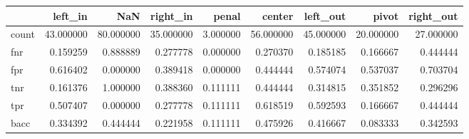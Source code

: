\begin{tabular}{lrrrrrrrr}
\toprule
{} &    left\_in &        NaN &   right\_in &     penal &     center &   left\_out &      pivot &  right\_out \\
\midrule
count &  43.000000 &  80.000000 &  35.000000 &  3.000000 &  56.000000 &  45.000000 &  20.000000 &  27.000000 \\
fnr   &   0.159259 &   0.888889 &   0.277778 &  0.000000 &   0.270370 &   0.185185 &   0.166667 &   0.444444 \\
fpr   &   0.616402 &   0.000000 &   0.389418 &  0.000000 &   0.444444 &   0.574074 &   0.537037 &   0.703704 \\
tnr   &   0.161376 &   1.000000 &   0.388360 &  0.111111 &   0.444444 &   0.314815 &   0.351852 &   0.296296 \\
tpr   &   0.507407 &   0.000000 &   0.277778 &  0.111111 &   0.618519 &   0.592593 &   0.166667 &   0.444444 \\
bacc  &   0.334392 &   0.444444 &   0.221958 &  0.111111 &   0.475926 &   0.416667 &   0.083333 &   0.342593 \\
\bottomrule
\end{tabular}
